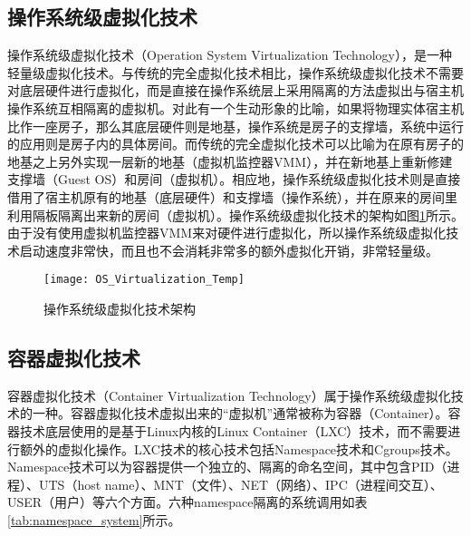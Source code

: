 \subsection{操作系统级虚拟化技术}

操作系统级虚拟化技术（Operation System Virtualization Technology），是一种轻量级虚拟化技术\citep{morabito2017virtualization}。与传统的完全虚拟化技术相比，操作系统级虚拟化技术不需要对底层硬件进行虚拟化，而是直接在操作系统层上采用隔离的方法虚拟出与宿主机操作系统互相隔离的虚拟机。对此有一个生动形象的比喻，如果将物理实体宿主机比作一座房子，那么其底层硬件则是地基，操作系统是房子的支撑墙，系统中运行的应用则是房子内的具体房间。而传统的完全虚拟化技术可以比喻为在原有房子的地基之上另外实现一层新的地基（虚拟机监控器VMM），并在新地基上重新修建支撑墙（Guest OS）和房间（虚拟机）。相应地，操作系统级虚拟化技术则是直接借用了宿主机原有的地基（底层硬件）和支撑墙（操作系统），并在原来的房间里利用隔板隔离出来新的房间（虚拟机）。操作系统级虚拟化技术的架构如图\ref{fig:os_virtualization}所示\citep{xavier2013performance}。由于没有使用虚拟机监控器VMM来对硬件进行虚拟化，所以操作系统级虚拟化技术启动速度非常快，而且也不会消耗非常多的额外虚拟化开销，非常轻量级\citep{babu2014system}。

\begin{figure}[!htbp]
    \centering
    \texttt{[image: OS\_Virtualization\_Temp]}
    \caption{操作系统级虚拟化技术架构}
    \label{fig:os_virtualization}
\end{figure}

\subsection{容器虚拟化技术}

容器虚拟化技术（Container Virtualization Technology）属于操作系统级虚拟化技术的一种\citep{vaughan2006new}。容器虚拟化技术虚拟出来的“虚拟机”通常被称为容器（Container）。容器技术底层使用的是基于Linux内核的Linux Container（LXC）技术，而不需要进行额外的虚拟化操作\cite{celesti2016exploring}。LXC技术的核心技术包括Namespace技术和Cgroups技术\cite{肖伟民2019嵌入式虚拟化}。Namespace技术可以为容器提供一个独立的、隔离的命名空间，其中包含PID（进程）、UTS（host name）、MNT（文件）、NET（网络）、IPC（进程间交互）、USER（用户）等六个方面\cite{liu2014researchandimplementation}。六种namespace隔离的系统调用如表\ref{tab:namespace_system}所示。


